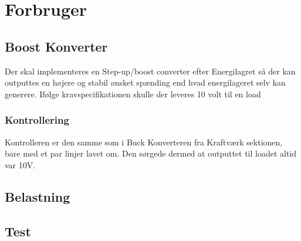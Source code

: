 \documentclass[../main.tex]{subfiles}
\begin{document}
\chapter{Forbruger} \label{Chap:Forbruger}

\section{Boost Konverter}
Der skal implementeres en Step-up/boost converter efter Energilagret så der kan outputtes en højere og stabil ønsket spænding end hvad energilageret selv kan generere. Ifølge kravspecifikationen skulle der leveres 10 volt til en load
\subsection{Kontrollering}
Kontrolleren er den samme som i Buck Konverteren fra Kraftværk sektionen, bare med et par linjer lavet om. Den sørgede dermed at outputtet til loadet altid var 10V.

\section{Belastning}
\section{Test}
\end{document}
